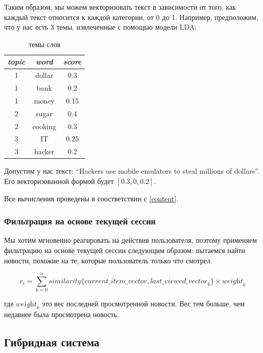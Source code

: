 \documentclass[14pt]{matmex-diploma-custom}
\begin{document}
Таким образом, мы можем векторизовать текст в зависимости от того, как каждый текст относится к каждой категории, от 0 до 1.
Например, предположим, что у нас есть 3 темы, извлеченные с помощью модели LDA:

\begin{table}[h]
\centering
\begin{tabular}{ccc}
    \toprule
\textit{topic} & \textit{word} & \textit{score} \\
    \midrule
1 & dollar & 0.3 \\
1 & bank & 0.2 \\
1 & money & 0.15 \\
2 & sugar & 0.4 \\
2 & cooking & 0.3 \\
3 & IT & 0.25 \\
3 & hacker & 0.2 \\
\bottomrule
\end{tabular}%
\caption{темы слов}
\label{tab:words_topics}
\end{table}

Допустим у нас текст: ``Hackers use mobile emulators to steal millions of dollars''. Его векторизованной формой будет $[0.3, 0, 0.2]$.

Все вычисления проведены в соостветствии с \ref{content}.


\subsubsection{Фильтрация на основе текущей сессии}

Мы хотим мгновенно реагировать на действия пользователя, поэтому применяем фильтрацию на основе текущей сессии следующим образом:
пытаемся найти новости, похожие на те, которые пользователь только что смотрел.

\begin{equation}
    r_{i}=\sum_{k=0}^{n} \textit{similarity}\{\textit{current\_item\_vector}, \textit{last\_viewed\_vector}_{k}\} \times \textit{weight}_k
\end{equation}


где $\textit{weight}_k$ это вес последней просмотренной новости. Вес тем больше, чем недавнее была просмотрена новость.



\subsection{Гибридная система}
\end{document}
